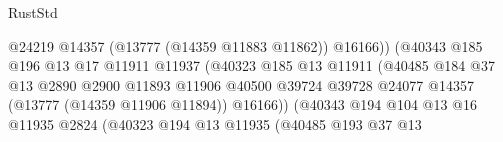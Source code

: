 \begin{lexlean}{RustStd}
\begin{coremodule}
                                                  @24219
                                                  @14357
                                                  (@13777 (@14359 @11883 @11862))
                                                  @16166))
                                              (@40343
                                                @185
                                                @196
                                                @13
                                                @17
                                                @11911
                                                @11937
                                                (@40323
                                                  @185
                                                  @13
                                                  @11911
                                                  (@40485
                                                    @184
                                                    @37
                                                    @13
                                                    @2890
                                                    @2900
                                                    @11893
                                                    @11906
                                                    @40500
                                                    @39724
                                                    @39728
                                                    @24077
                                                    @14357
                                                    (@13777 (@14359 @11906 @11894))
                                                    @16166))
                                                (@40343
                                                  @194
                                                  @104
                                                  @13
                                                  @16
                                                  @11935
                                                  @2824
                                                  (@40323
                                                    @194
                                                    @13
                                                    @11935
                                                    (@40485
                                                      @193
                                                      @37
                                                      @13

\end{coremodule}
\end{lexlean}
